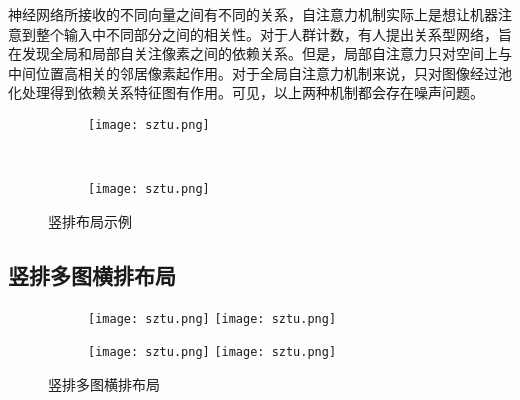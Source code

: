 神经网络所接收的不同向量之间有不同的关系，自注意力机制实际上是想让机器注意到整个输入中不同部分之间的相关性。对于人群计数，有人提出关系型网络，旨在发现全局和局部自关注像素之间的依赖关系。但是，局部自注意力只对空间上与中间位置高相关的邻居像素起作用。对于全局自注意力机制来说，只对图像经过池化处理得到依赖关系特征图有作用。可见，以上两种机制都会存在噪声问题。
\begin{figure}[!htb]
    \centering
    \begin{subfigure}[t]{0.15\linewidth}
        \begin{minipage}[b]{1\linewidth}
        \texttt{[image: sztu.png]}
        \caption{}
        \end{minipage}
    \end{subfigure}\\
    \begin{subfigure}[t]{0.15\linewidth}
        \begin{minipage}[b]{1\linewidth}
        \texttt{[image: sztu.png]}
        \caption{}
        \end{minipage}
    \end{subfigure}
    \caption{竖排布局示例}
    \label{F.sztu_col}
\end{figure}

\lipsum

\subsection{竖排多图横排布局}

\begin{figure}[!htb]
    \centering
    \begin{subfigure}[t]{0.13\linewidth}
        \begin{minipage}[b]{1\linewidth}
        \texttt{[image: sztu.png]} \vspace{-1ex} \vfill
        \texttt{[image: sztu.png]}
        \end{minipage}
        \caption{}
    \end{subfigure}
    \begin{subfigure}[t]{0.13\linewidth}
        \begin{minipage}[b]{1\linewidth}
        \texttt{[image: sztu.png]} \vspace{-1ex} \vfill
        \texttt{[image: sztu.png]}
        \end{minipage}
        \caption{}
    \end{subfigure}
    \caption{竖排多图横排布局}
    \label{F.sztu_col_row}
\end{figure}

